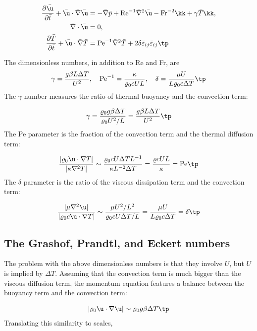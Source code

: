 \documentclass[graybox,envcountchap,sectrefs,final]{svmonodo}
\begin{document}
\begin{align}
\frac{\partial \bar\u}{\partial \bar t} +
\bar \u\cdot\bar \nabla\bar\u
&= -\bar\nabla \bar p + \hbox{Re}^{-1}\bar \nabla^2\bar \u
- \hbox{Fr}^{-2}\kk  + \gamma \bar T\kk,
\label{scale:fluid:free_convection:eq:momentum_TB0}\\ 
\bar\nabla\cdot\bar\u & = 0,
\label{scale:fluid:free_convection:eq:cont_TB0}\\ 
\frac{\partial \bar T}{\partial \bar t} +
\bar\u\cdot\bar\nabla \bar T
&= \hbox{Pe}^{-1}\bar \nabla^2 \bar T + 2\delta
\bar\varepsilon_{ij}\bar\varepsilon_{ij}\tp
\label{scale:fluid:free_convection:eq:energy_TB0}
\end{align}

The dimensionless numbers, in addition to Re and Fr, are
\[
\gamma = \frac{g\beta L\Delta T }{U^2},\quad
\hbox{Pe}^{-1} = \frac{\kappa }{\varrho_0 c UL},\quad
\delta = \frac{\mu U}{L\varrho_0 c \Delta T}\tp
\]
The $\gamma$ number measures the ratio of thermal buoyancy and
the convection term:

\[ \gamma = \frac{\varrho_0 g\beta \Delta T }{\varrho_0 U^2/L}
= \frac{g\beta L\Delta T }{U^2}\tp\]
The Pe parameter is the fraction of the convection term
and the thermal diffusion term:

\[ \frac{|\varrho_0\u\cdot\nabla T|}{|\kappa\nabla^2 T|}\sim
\frac{\varrho_0 c U \Delta T L^{-1}}{\kappa L^{-2}\Delta T}
= \frac{\varrho c UL}{\kappa } = \hbox{Pe}\tp\]
The $\delta$ parameter is the ratio of the viscous dissipation term
and the convection term:

\[ \frac{|\mu\nabla^2\u|}{|\varrho_0c\u\cdot\nabla T|}\sim
\frac{\mu U^2/L^2}{\varrho_0 c U \Delta T/L} =
\frac{\mu U}{L\varrho_0 c \Delta T} = \delta\tp
\]

\subsection{The Grashof, Prandtl, and Eckert numbers}


The problem with the above dimensionless numbers is that they involve
$U$, but $U$ is implied by $\Delta T$. Assuming that the convection
term is much bigger than the viscous diffusion term, the momentum
equation features a balance between the buoyancy term and the convection
term:

\[ |\varrho_0 \u\cdot\nabla\u| \sim \varrho_0 g \beta\Delta T\tp\]
Translating this similarity to scales,
\end{document}
